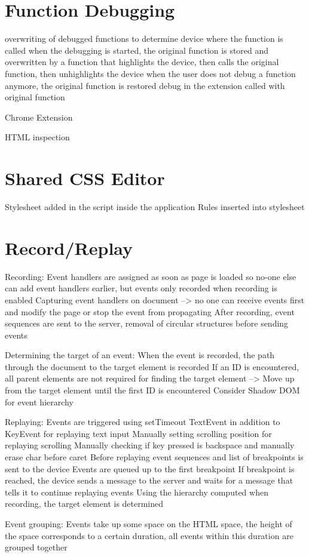 \section{Function Debugging}

overwriting of debugged functions to determine device where the function is called
when the debugging is started, the original function is stored and overwritten by a function that highlights the device, then calls the original function, then unhighlights the device
when the user does not debug a function anymore, the original function is restored
debug in the extension called with original function

Chrome Extension

HTML inspection

\section{Shared CSS Editor}

Stylesheet added in the script inside the application
Rules inserted into stylesheet

\section{Record/Replay}

Recording:
Event handlers are assigned as soon as page is loaded so no-one else can add event handlers earlier, but events only recorded when recording is enabled
Capturing event handlers on document --> no one can receive events first and modify the page or stop the event from propagating
After recording, event sequences are sent to the server, removal of circular structures before sending events

Determining the target of an event: When the event is recorded, the path through the document to the target element is recorded
If an ID is encountered, all parent elements are not required for finding the target element
--> Move up from the target element until the first ID is encountered
Consider Shadow DOM for event hierarchy

Replaying:
Events are triggered using setTimeout
TextEvent in addition to KeyEvent for replaying text input
Manually setting scrolling position for replaying scrolling
Manually checking if key pressed is backspace and manually erase char before caret
Before replaying event sequences and list of breakpoints is sent to the device
Events are queued up to the first breakpoint
If breakpoint is reached, the device sends a message to the server and waits for a message that tells it to continue replaying events
Using the hierarchy computed when recording, the target element is determined

Event grouping:
Events take up some space on the HTML space, the height of the space corresponds to a certain duration, all events within this duration are grouped together